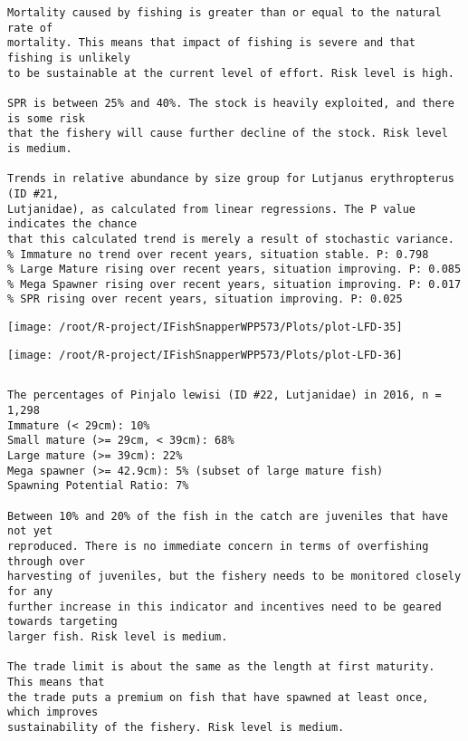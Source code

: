 \documentclass{report}\usepackage[]{graphicx}\usepackage[]{color}
\makeatletter
\def\maxwidth{ %
  \ifdim\Gin@nat@width>\linewidth
    \linewidth
  \else
    \Gin@nat@width
  \fi
}
\newenvironment{kframe}{%
 \def\at@end@of@kframe{}%
 \ifinner\ifhmode%
  \def\at@end@of@kframe{\end{minipage}}%
  \begin{minipage}{\columnwidth}%
 \fi\fi%
 \def\FrameCommand##1{\hskip\@totalleftmargin \hskip-\fboxsep
 \colorbox{shadecolor}{##1}\hskip-\fboxsep
     \hskip-\linewidth \hskip-\@totalleftmargin \hskip\columnwidth}%
 \MakeFramed {\advance\hsize-\width
   \@totalleftmargin\z@ \linewidth\hsize
   \@setminipage}}%
 {\par\unskip\endMakeFramed%
 \at@end@of@kframe}
\newenvironment{knitrout}{}{} %
\makeatother
\begin{document}
\begin{knitrout}
\begin{kframe}
\begin{verbatim}
Mortality caused by fishing is greater than or equal to the natural rate of
mortality. This means that impact of fishing is severe and that fishing is unlikely
to be sustainable at the current level of effort. Risk level is high.
 
SPR is between 25% and 40%. The stock is heavily exploited, and there is some risk
that the fishery will cause further decline of the stock. Risk level is medium.
 
Trends in relative abundance by size group for Lutjanus erythropterus (ID #21,
Lutjanidae), as calculated from linear regressions. The P value indicates the chance
that this calculated trend is merely a result of stochastic variance.
% Immature no trend over recent years, situation stable. P: 0.798
% Large Mature rising over recent years, situation improving. P: 0.085
% Mega Spawner rising over recent years, situation improving. P: 0.017
% SPR rising over recent years, situation improving. P: 0.025
\end{verbatim}
\end{kframe}
\texttt{[image: /root/R-project/IFishSnapperWPP573/Plots/plot-LFD-35]} 

\texttt{[image: /root/R-project/IFishSnapperWPP573/Plots/plot-LFD-36]} 
\begin{kframe}\begin{verbatim}
\end{verbatim}
\end{kframe}
\clearpage
\newpage
\begin{kframe}\begin{verbatim}The percentages of Pinjalo lewisi (ID #22, Lutjanidae) in 2016, n = 1,298
Immature (< 29cm): 10%
Small mature (>= 29cm, < 39cm): 68%
Large mature (>= 39cm): 22%
Mega spawner (>= 42.9cm): 5% (subset of large mature fish)
Spawning Potential Ratio: 7%
 
Between 10% and 20% of the fish in the catch are juveniles that have not yet
reproduced. There is no immediate concern in terms of overfishing through over
harvesting of juveniles, but the fishery needs to be monitored closely for any
further increase in this indicator and incentives need to be geared towards targeting
larger fish. Risk level is medium.

The trade limit is about the same as the length at first maturity.  This means that
the trade puts a premium on fish that have spawned at least once, which improves
sustainability of the fishery. Risk level is medium.


\end{verbatim}
\end{kframe}
\end{knitrout}
\end{document}
